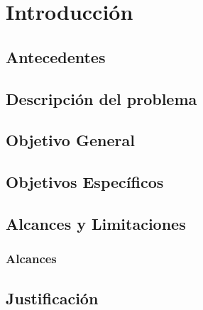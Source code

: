 
\chapter{Introducción}

\section{Antecedentes}

\section{Descripción del problema}

\section{Objetivo General}

\section{Objetivos Específicos}

\section{Alcances y Limitaciones}

\subsection{Alcances}

\section{Justificación}

